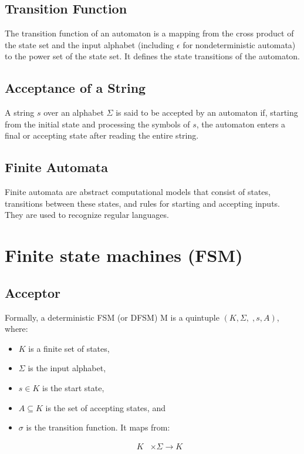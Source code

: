 \documentclass[hidelinks,12pt]{article}
\begin{document}
\subsection{Transition Function}
The transition function of an automaton is a mapping from the cross product of
the state set and the input alphabet (including $\epsilon$ for nondeterministic
automata) to the power set of the state set. It defines the state transitions
of the automaton.

\subsection{Acceptance of a String}
A string $s$ over an alphabet $\Sigma$ is said to be accepted by an automaton
if, starting from the initial state and processing the symbols of $s$, the
automaton enters a final or accepting state after reading the entire string.

\subsection{Finite Automata}
Finite automata are abstract computational models that consist of states,
transitions between these states, and rules for starting and accepting inputs.
They are used to recognize regular languages.


\section{Finite state machines (FSM)}

\subsection{Acceptor}

Formally, a deterministic FSM (or DFSM) M is a quintuple $(K, \Sigma, , s, A)$,
where: 



\begin{itemize} 
    \item $K$ is a finite set of states,
    \item $\Sigma$ is the input alphabet, 
    \item $s \in K$ is the start state, 
    \item $A \subseteq K$ is the set of accepting states, and 
    \item $\sigma$ is the transition function. It maps from:

        \begin{align*} 
            K &\times \Sigma \to K \\ 
        \end{align*}

\end{itemize}
\end{document}
